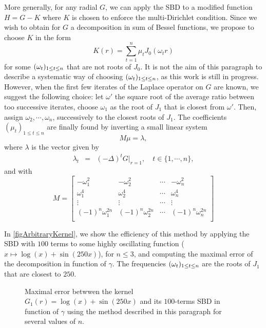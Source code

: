 \documentclass[smallextended]{svjour3}
\begin{document}
More generally, for any radial $G$, we can apply the SBD to a modified function $H = G - K$ where $K$ is chosen to enforce the multi-Dirichlet condition. Since we wish to obtain for $G$ a decomposition in sum of Bessel functions, we propose to choose $K$ in the form 
\[K(r) = \sum_{t=1}^{n} \mu_t J_0(\omega_t r)\]
for some $(\omega_{t})_{1 \leq t \leq n}$ that are not roots of $J_0$. It is not the aim of this paragraph to describe a systematic way of choosing $(\omega_{t})_{1 \leq t \leq n}$, as this work is still in progress. However, when the first few iterates of the Laplace operator on $G$ are known, we suggest the following choice: let $\omega'$ the square root of the average ratio between too successive iterates, choose $\omega_1$ as the root of $J_1$ that is closest from $\omega'$. Then, assign $\omega_2, \cdots, \omega_n$, successively to the closest roots of $J_1$. The coefficients $(\mu_t)_{1 \leq t \leq n}$ are finally found by inverting a small linear system 
\[M\mu = \lambda,\]
where $\lambda$ is the vector given by
\begin{eqnarray*}
	\lambda_t &=& (-\Delta)^t G \big|_{r=1}, \quad t\in \{1,\cdots,n\},
\end{eqnarray*}
and with
\[M=
	\begin{bmatrix}
		-\omega_1^2      & -\omega_2^2             & \cdots & -\omega_n^2  \\
			\omega_1^4   & \omega_2^4 		              & \cdots & \omega_n^4   \\
		\vdots      	& \vdots                              & \cdots & \vdots     \\
		(-1)^n \omega_1^{2n}      & (-1)^n \omega_2^{2n}  & \cdots &(-1)^n \omega_n^{2n} \\ 
	\end{bmatrix}
\]


In \autoref{figArbitraryKernel}, we show the efficiency of this method by applying the SBD with $100$ terms to some highly oscillating function ($x \mapsto \log(x) + \sin(250x)$), 
for $n \leq 3$, and computing the maximal error of the decomposition in function of $\gamma$. The frequencies $(\omega_{t})_{1 \leq t \leq n}$ are the roots of $J_1$ that are closest to $250$. 
										
\begin{figure}[h]	
	\setlength{\plotwidth}{0.7\textwidth}
	\centering
	
	\caption{Maximal error betwwen the kernel $G_1(r) =  \log(x) + \sin(250x)$ and its $100$-terms SBD in function of $\gamma$ using the method described in this paragraph for several values of $n$.}
	\label{figArbitraryKernel}
\end{figure}
																														
\end{document}
